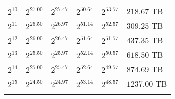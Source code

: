 \begin{tabular}{llllll}
$2^{10}$ & $2^{27.00}$ & $2^{27.47}$ & $2^{50.64}$ & $2^{53.57}$ & $218.67$ TB \\
$2^{11}$ & $2^{26.50}$ & $2^{26.97}$ & $2^{51.14}$ & $2^{52.57}$ & $309.25$ TB \\
$2^{12}$ & $2^{26.00}$ & $2^{26.47}$ & $2^{51.64}$ & $2^{51.57}$ & $437.35$ TB \\
$2^{13}$ & $2^{25.50}$ & $2^{25.97}$ & $2^{52.14}$ & $2^{50.57}$ & $618.50$ TB \\
$2^{14}$ & $2^{25.00}$ & $2^{25.47}$ & $2^{52.64}$ & $2^{49.57}$ & $874.69$ TB \\
$2^{15}$ & $2^{24.50}$ & $2^{24.97}$ & $2^{53.14}$ & $2^{48.57}$ & $1237.00$ TB \\
 &  &  &  &  &  \\
\end{tabular}